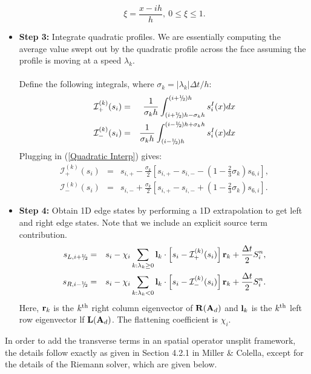 \begin{itemize}
\begin{equation}
\xi = \frac{x - ih}{h}, ~ 0 \le \xi \le 1.
\end{equation}
\item {\bf Step 3:} Integrate quadratic profiles.  We are essentially
  computing the average value swept out by the quadratic profile
  across the face assuming the profile is moving at a speed
  $\lambda_k$.\\ \\ Define the following integrals, where $\sigma_k =
  |\lambda_k|\Delta t/h$:
\begin{eqnarray}
\mathcal{I}^{(k)}_{+}(s_i) &=& \frac{1}{\sigma_k h}\int_{(i+\myhalf)h-\sigma_k h}^{(i+\myhalf)h}s_i^I(x)dx \\
\mathcal{I}^{(k)}_{-}(s_i) &=& \frac{1}{\sigma_k h}\int_{(i-\myhalf)h}^{(i-\myhalf)h+\sigma_k h}s_i^I(x)dx
\end{eqnarray}
Plugging in (\ref{Quadratic Interp}) gives:
\begin{eqnarray}
\mathcal{I}^{(k)}_{+}(s_i) &=& s_{i,+} - \frac{\sigma_k}{2}\left[s_{i,+}-s_{i,-}-\left(1-\frac{2}{3}\sigma_k\right)s_{6,i}\right], \\
\mathcal{I}^{(k)}_{-}(s_i) &=& s_{i,-} + \frac{\sigma_k}{2}\left[s_{i,+}-s_{i,-}+\left(1-\frac{2}{3}\sigma_k\right)s_{6,i}\right].
\end{eqnarray}
\item {\bf Step 4:} Obtain 1D edge states by performing a 1D
  extrapolation to get left and right edge states.  Note that we
  include an explicit source term contribution.
\begin{eqnarray}
s_{L,i+\myhalf} &=& s_i - \chi_i\sum_{k:\lambda_k \ge 0}\lb_k\cdot\left[s_i-\mathcal{I}^{(k)}_{+}(s_i)\right]\rb_k + \frac{\dt}{2}S_i^n, \\
s_{R,i-\myhalf} &=& s_i - \chi_i\sum_{k:\lambda_k < 0}\lb_k\cdot\left[s_i-\mathcal{I}^{(k)}_{-}(s_i)\right]\rb_k + \frac{\dt}{2}S_i^n.
\end{eqnarray} 
Here, ${\bf r}_k$ is the $k^{\rm th}$ right column eigenvector of
${\bf R}({\bf A}_d)$ and ${\bf l}_k$ is the $k^{\rm th}$ left row eigenvector lf
${\bf L}({\bf A}_d)$.  The flattening coefficient is $\chi_i$.
\end{itemize}
In order to add the transverse terms in an spatial operator unsplit
framework, the details follow exactly as given in Section 4.2.1 in
Miller \& Colella, except for the details of the Riemann solver,
which are given below.


